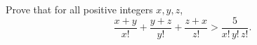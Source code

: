 Prove that for all positive integers $x,y,z$,
\[
\dfrac{x+y}{x!}+\dfrac{y+z}{y!}+\dfrac{z+x}{z!}>\dfrac{5}{x!\,y!\,z!}.
\]
